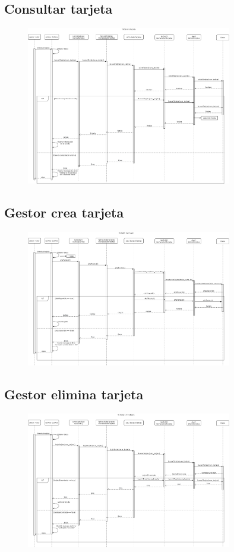 \documentclass[12pt]{article}
\begin{document}
\subsection{Consultar tarjeta}
\begin{figure}[H]
    \centering
    \includegraphics[width=0.8\textwidth]{images/consultarTarjeta.png}
\end{figure}
\subsection{Gestor crea tarjeta}
\begin{figure}[H]
    \centering
    \includegraphics[width=0.8\textwidth]{images/14-Gestor_crea_tarjeta.png}
\end{figure}
\subsection{Gestor elimina tarjeta}
\begin{figure}[H]
    \centering
    \includegraphics[width=0.8\textwidth]{images/15-Gestor_elimina_tarjeta.png}
\end{figure}
\end{document}
